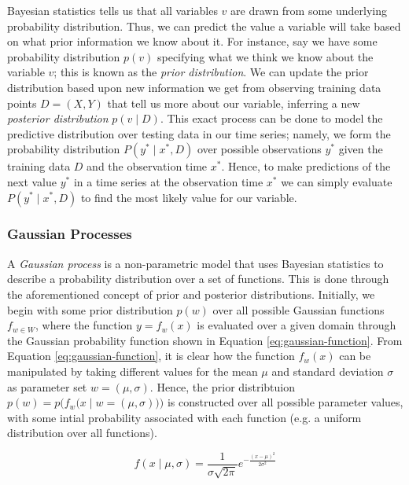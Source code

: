 \documentclass[a4paper, 11pt]{article}
\begin{document}
    Bayesian statistics tells us that all variables $v$ are drawn from some underlying probability distribution. Thus, we can predict the value a variable will take based on what prior information we know about it. For instance, say we have some probability distribution $p(v)$ specifying what we think we know about the variable $v$; this is known as the \emph{prior distribution}. We can update the prior distribution based upon new information we get from observing training data points $D = (X, Y)$ that tell us more about our variable, inferring a new \emph{posterior distribution} $p(v \mid D)$. This exact process can be done to model the predictive distribution over testing data in our time series; namely, we form the probability distribution $P(y^* \mid x^*, D)$ over possible observations $y^*$ given the training data $D$ and the observation time $x^*$. Hence, to make predictions of the next value $y^*$ in a time series at the observation time $x^*$ we can simply evaluate $P(y^* \mid x^*, D)$ to find the most likely value for our variable.

    \subsubsection{Gaussian Processes}

    A \emph{Gaussian process} is a non-parametric model that uses Bayesian statistics to describe a probability distribution over a set of functions. This is done through the aforementioned concept of prior and posterior distributions. Initially, we begin with some prior distribution $p(w)$ over all possible Gaussian functions $f_{w \in W}$, where the function $y = f_w(x)$ is evaluated over a given domain through the Gaussian probability function shown in Equation \ref{eq:gaussian-function}. From Equation \ref{eq:gaussian-function}, it is clear how the function $f_w(x)$ can be manipulated by taking different values for the mean $\mu$ and standard deviation $\sigma$ as parameter set $w = (\mu, \sigma)$. Hence, the prior distribtuion $p(w) = p\big(f_w \big(x \mid w = \left(\mu, \sigma \right) \big) \big)$ is constructed over all possible parameter values, with some intial probability associated with each function (e.g. a uniform distribution over all functions).

    \begin{equation}
        f \left(x \mid \mu, \sigma \right) = \frac{1}{\sigma \sqrt{2 \pi}} e^{- \frac{\left(x - \mu\right)^2}{2 \sigma^2}}
        \label{eq:gaussian-function}
    \end{equation}
\end{document}
